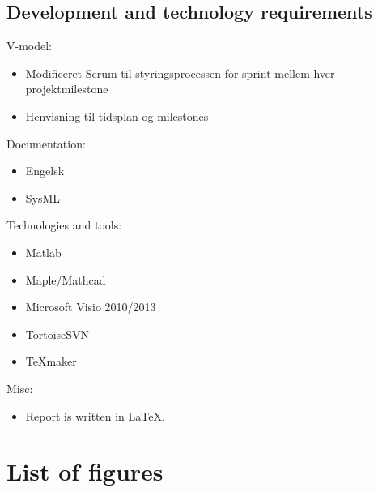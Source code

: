 \subsection{Development and technology requirements }
V-model:\\
\begin{itemize}
\item Modificeret Scrum til styringsprocessen for sprint mellem hver projektmilestone
\item Henvisning til tidsplan og milestones
\end{itemize}

Documentation:\\
\begin{itemize}
\item Engelsk
\item SysML
\end{itemize}

Technologies and tools:\\
\begin{itemize}
\item Matlab
\item Maple/Mathcad
\item Microsoft Visio 2010/2013
\item TortoiseSVN
\item TeXmaker
\end{itemize}

Misc:\\
\begin{itemize}
\item Report is written in LaTeX.
\end{itemize}
\section{List of figures}